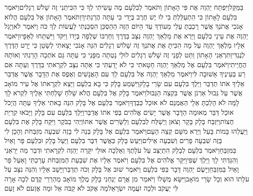 \documentclass[../main/main.tex]{subfiles}
\begin{document}
\begin{multicols*}{\ncols}
בַּמַּקֵּל\PreVerseSpace{}וַיִּפְתַּח יַהְוֶה אֶת פִּי הָאָתוֹן וַתֹּאמֶר לְבִלְעָם מֶה עָשִׂיתִי לְךָ כִּי הִכִּיתַנִי זֶה שָׁלֹשׁ רְגָלִים\PreVerseSpace{}וַיֹּאמֶר בִּלְעָם לָאָתוֹן כִּי הִתְעַלַּלְתְּ בִּי לוּ יֶשׁ חֶרֶב בְּיָדִי כִּי עַתָּה הֲרַגְתִּיךְ\PreVerseSpace{}וַתֹּאמֶר הָאָתוֹן אֶל בִּלְעָם הֲלוֹא אָנֹכִי אֲתֹנְךָ אֲשֶׁר רָכַבְתָּ עָלַי מֵעוֹדְךָ עַד הַיּוֹם הַזֶּה הַהַסְכֵּן הִסְכַּנְתִּי לַעֲשׂוֹת לְךָ כֹּה וַיֹּאמֶר לֹא\PreVerseSpace{}וַיְגַל יַהְוֶה אֶת עֵינֵי בִלְעָם וַיַּרְא אֶת מַלְאַךְ יַהְוֶה נִצָּב בַּדֶּרֶךְ וְחַרְבּוֹ שְׁלֻפָה בְּיָדוֹ וַיִּקֹּד וַיִּשְׁתַּחוּ לְאַפָּיו\PreVerseSpace{}וַיֹּאמֶר אֵלָיו מַלְאַךְ יַהְוֶה עַל מָה הִכִּיתָ אֶת אֲתֹנְךָ זֶה שָׁלוֹשׁ רְגָלִים הִנֵּה אָנֹכִי יָצָאתִי לְשָׂטָן כִּי יָרַט הַדֶּרֶךְ לְנֶגְדִּי\PreVerseSpace{}וַתִּרְאַנִי הָאָתוֹן וַתֵּט לְפָנַי זֶה שָׁלֹשׁ רְגָלִים לוּלֵי\SubEnd{} נָטְתָה מִפָּנַי כִּי עַתָּה גַּם אֹתְכָה הָרַגְתִּי וְאוֹתָהּ הֶחֱיֵיתִי\PreVerseSpace{}וַיֹּאמֶר בִּלְעָם אֶל מַלְאַךְ יַהְוֶה חָטָאתִי כִּי לֹא יָדַעְתִּי כִּי אַתָּה נִצָּב לִקְרָאתִי בַּדָּרֶךְ וְעַתָּה אִם רַע בְּעֵינֶיךָ אָשׁוּבָה לִּי\PreVerseSpace{}וַיֹּאמֶר מַלְאַךְ יַהְוֶה אֶל בִּלְעָם לֵךְ עִם הָאֲנָשִׁים וְאֶפֶס אֶת הַדָּבָר אֲשֶׁר אֲדַבֵּר אֵלֶיךָ אֹתוֹ תְדַבֵּר וַיֵּלֶךְ בִּלְעָם עִם שָׂרֵי בָלָק\PreVerseSpace{}וַיִּשְׁמַע בָּלָק כִּי בָא בִלְעָם וַיֵּצֵא לִקְרָאתוֹ אֶל עִיר מוֹאָב אֲשֶׁר עַל גְּבוּל אַרְנֹן אֲשֶׁר בִּקְצֵה הַגְּבוּל\PreVerseSpace{}וַיֹּאמֶר בָּלָק אֶל בִּלְעָם הֲלֹא שָׁלֹחַ שָׁלַחְתִּי אֵלֶיךָ לִקְרֹא לָךְ לָמָּה לֹא הָלַכְתָּ אֵלָי הַאֻמְנָם לֹא אוּכַל כַּבְּדֶךָ\PreVerseSpace{}וַיֹּאמֶר בִּלְעָם אֶל בָּלָק הִנֵּה בָאתִי אֵלֶיךָ עַתָּה הֲיָכֹל אוּכַל דַּבֵּר מְאוּמָה הַדָּבָר אֲשֶׁר יָשִׂים אֱלֹהִים בְּפִי אֹתוֹ אֲדַבֵּר\PreVerseSpace{}וַיֵּלֶךְ בִּלְעָם עִם בָּלָק וַיָּבֹאוּ קִרְיַת חֻצוֹת\PreVerseSpace{}וַיִּזְבַּח בָּלָק בָּקָר וָצֹאן וַיְשַׁלַּח לְבִלְעָם וְלַשָּׂרִים אֲשֶׁר אִתּוֹ\PreVerseSpace{}וַיְהִי בַבֹּקֶר וַיִּקַּח בָּלָק אֶת בִּלְעָם וַיַּעֲלֵהוּ בָּמוֹת בָּעַל וַיַּרְא מִשָּׁם קְצֵה הָעָם\PreChapterSpace{}וַיֹּאמֶר בִּלְעָם אֶל בָּלָק בְּנֵה לִי בָזֶה שִׁבְעָה מִזְבְּחֹת וְהָכֵן לִי בָּזֶה שִׁבְעָה פָרִים וְשִׁבְעָה אֵילִים\PreVerseSpace{}וַיַּעַשׂ בָּלָק כַּאֲשֶׁר דִּבֶּר בִּלְעָם וַיַּעַל בָּלָק וּבִלְעָם פָּר וָאַיִל בַּמִּזְבֵּחַ\PreVerseSpace{}וַיֹּאמֶר בִּלְעָם לְבָלָק הִתְיַצֵּב עַל עֹלָתֶךָ וְאֵלְכָה אוּלַי יִקָּרֵה יַהְוֶה לִקְרָאתִי וּדְבַר מַה יַּרְאֵנִי וְהִגַּדְתִּי לָךְ וַיֵּלֶךְ שֶׁפִי\PreVerseSpace{}וַיִּקָּר אֱלֹהִים אֶל בִּלְעָם וַיֹּאמֶר אֵלָיו אֶת שִׁבְעַת הַמִּזְבְּחֹת עָרַכְתִּי וָאַעַל פָּר וָאַיִל בַּמִּזְבֵּחַ\PreVerseSpace{}וַיָּשֶׂם יַהְוֶה דָּבָר בְּפִי בִלְעָם וַיֹּאמֶר שׁוּב אֶל בָּלָק וְכֹה תְדַבֵּר\PreVerseSpace{}וַיָּשָׁב אֵלָיו וְהִנֵּה נִצָּב עַל עֹלָתוֹ הוּא וְכָל שָׂרֵי מוֹאָב\PreVerseSpace{}וַיִּשָּׂא מְשָׁלוֹ וַיֹּאמַר מִן אֲרָם יַנְחֵנִי בָלָק מֶלֶךְ מוֹאָב מֵהַרְרֵי קֶדֶם לְכָה אָרָה לִּי יַעֲקֹב וּלְכָה זֹעֲמָה יִשְׂרָאֵל\PreVerseSpace{}מָה אֶקֹּב לֹא קַבֹּה אֵל וּמָה אֶזְעֹם לֹא זָעַם 
\end{multicols*}
\end{document}

